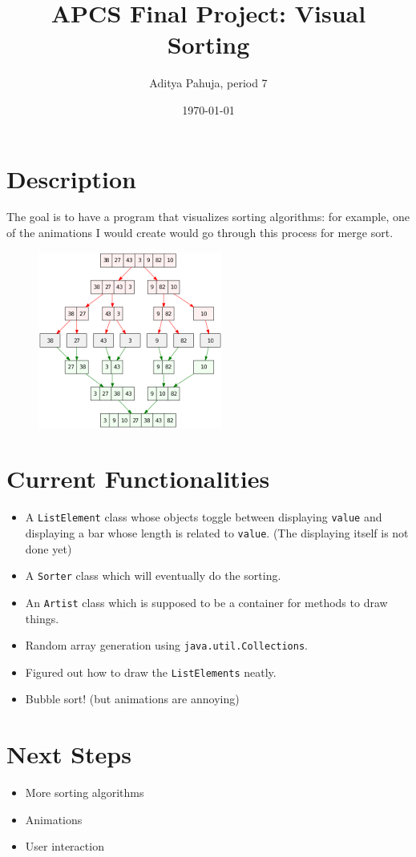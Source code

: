 \documentclass{scrartcl}
\title{APCS Final Project: Visual Sorting}
\author{Aditya Pahuja, period 7}
\date{\today}
\providecommand{\ii}{\item}
\begin{document}
\maketitle

\section{Description}
The goal is to have a program that visualizes sorting algorithms:
for example, one of the animations I would create would go through
this process for merge sort.
\begin{figure}[h]
	\centering
	\includegraphics{mergeSort}
\end{figure}

\section{Current Functionalities}
\begin{itemize}
	\ii A \texttt{ListElement} class whose objects toggle between
	displaying \texttt{value} and displaying a bar whose length
	is related to \texttt{value}. (The displaying itself is not done yet)
	\ii A \texttt{Sorter} class which will eventually do the sorting.
	\ii An \texttt{Artist} class which is supposed to be a container for
	methods to draw things.
	\ii Random array generation using \texttt{java.util.Collections}.
	\ii Figured out how to draw the \texttt{ListElements} neatly.
	\ii Bubble sort! (but animations are annoying)
\end{itemize}

\section{Next Steps}
\begin{itemize}
	\ii More sorting algorithms
	\ii Animations
	\ii User interaction
\end{itemize}
\end{document}
